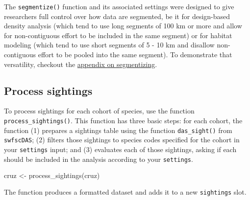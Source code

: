 \documentclass[
]{book}
\newenvironment{Shaded}{\begin{snugshade}}{\end{snugshade}}
\newcommand{\DecValTok}[1]{\textcolor[rgb]{0.00,0.00,0.81}{#1}}
\newcommand{\FunctionTok}[1]{\textcolor[rgb]{0.00,0.00,0.00}{#1}}
\newcommand{\NormalTok}[1]{#1}
\newcommand{\OtherTok}[1]{\textcolor[rgb]{0.56,0.35,0.01}{#1}}
\newcommand{\SpecialCharTok}[1]{\textcolor[rgb]{0.00,0.00,0.00}{#1}}
\newcommand{\StringTok}[1]{\textcolor[rgb]{0.31,0.60,0.02}{#1}}
\begin{document}
The \texttt{segmentize()} function and its associated settings were designed to give researchers full control over how data are segmented, be it for design-based density analysis (which tend to use long segments of 100 km or more and allow for non-contiguous effort to be included in the same segment) or for habitat modeling (which tend to use short segments of 5 - 10 km and disallow non-contiguous effort to be pooled into the same segment). To demonstrate that versatility, checkout the \protect\hyperlink{segmentizing}{appendix on segmentizing}.

\hypertarget{process-sightings}{%
\subsection*{Process sightings}\label{process-sightings}}

To process sightings for each cohort of species, use the function \texttt{process\_sightings()}. This function has three basic steps: for each cohort, the function (1) prepares a sightings table using the function \texttt{das\_sight()} from \texttt{swfscDAS}; (2) filters those sightings to species codes specified for the cohort in your \texttt{settings} input; and (3) evaluates each of those sightings, asking if each should be included in the analysis according to your \texttt{settings}.

\begin{Shaded}
\begin{Highlighting}[]
\NormalTok{cruz }\OtherTok{\textless{}{-}} \FunctionTok{process\_sightings}\NormalTok{(cruz)}
\end{Highlighting}
\end{Shaded}

The function produces a formatted dataset and adds it to a new \texttt{sightings} slot.

\begin{Shaded}
\end{Shaded}
\end{document}
